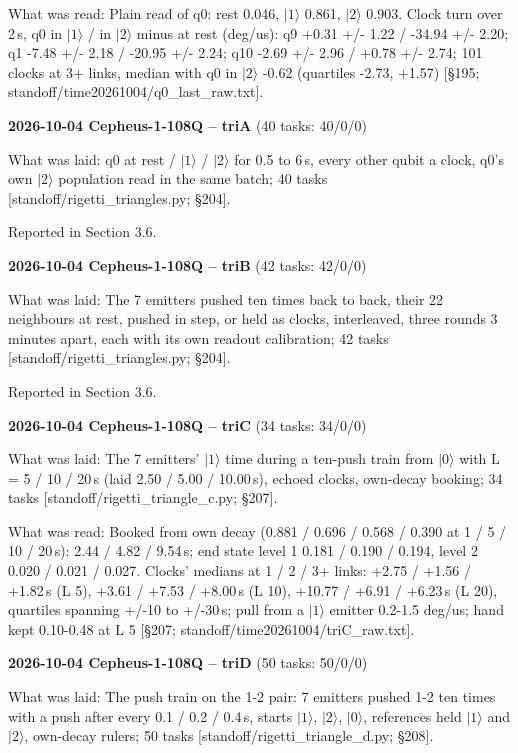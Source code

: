 \documentclass[11pt]{article}
\begin{document}
What was read: Plain read of q0: rest 0.046, \(|1\rangle\) 0.861, \(|2\rangle\) 0.903. Clock turn over 2\,\textmu s, q0 in \(|1\rangle\) / in \(|2\rangle\) minus at rest (deg/us): q9 +0.31 +/- 1.22 / -34.94 +/- 2.20; q1 -7.48 +/- 2.18 / -20.95 +/- 2.24; q10 -2.69 +/- 2.96 / +0.78 +/- 2.74; 101 clocks at 3+ links, median with q0 in \(|2\rangle\) -0.62 (quartiles -2.73, +1.57) {[}\S{}195; standoff/time20261004/q0\_last\_raw.txt{]}.

\textbf{2026-10-04 Cepheus-1-108Q -- triA} (40 tasks: 40/0/0)

What was laid: q0 at rest / \(|1\rangle\) / \(|2\rangle\) for 0.5 to 6\,\textmu s, every other qubit a clock, q0's own \(|2\rangle\) population read in the same batch; 40 tasks {[}standoff/rigetti\_triangles.py; \S{}204{]}.

Reported in Section 3.6.

\textbf{2026-10-04 Cepheus-1-108Q -- triB} (42 tasks: 42/0/0)

What was laid: The 7 emitters pushed ten times back to back, their 22 neighbours at rest, pushed in step, or held as clocks, interleaved, three rounds 3 minutes apart, each with its own readout calibration; 42 tasks {[}standoff/rigetti\_triangles.py; \S{}204{]}.

Reported in Section 3.6.

\textbf{2026-10-04 Cepheus-1-108Q -- triC} (34 tasks: 34/0/0)

What was laid: The 7 emitters' \(|1\rangle\) time during a ten-push train from \(|0\rangle\) with L = 5 / 10 / 20\,\textmu s (laid 2.50 / 5.00 / 10.00\,\textmu s), echoed clocks, own-decay booking; 34 tasks {[}standoff/rigetti\_triangle\_c.py; \S{}207{]}.

What was read: Booked from own decay (0.881 / 0.696 / 0.568 / 0.390 at 1 / 5 / 10 / 20\,\textmu s): 2.44 / 4.82 / 9.54\,\textmu s; end state level 1 0.181 / 0.190 / 0.194, level 2 0.020 / 0.021 / 0.027. Clocks' medians at 1 / 2 / 3+ links: +2.75 / +1.56 / +1.82\,\textmu s (L 5), +3.61 / +7.53 / +8.00\,\textmu s (L 10), +10.77 / +6.91 / +6.23\,\textmu s (L 20), quartiles spanning +/-10 to +/-30\,\textmu s; pull from a \(|1\rangle\) emitter 0.2-1.5 deg/us; hand kept 0.10-0.48 at L 5 {[}\S{}207; standoff/time20261004/triC\_raw.txt{]}.

\textbf{2026-10-04 Cepheus-1-108Q -- triD} (50 tasks: 50/0/0)

What was laid: The push train on the 1-2 pair: 7 emitters pushed 1-2 ten times with a push after every 0.1 / 0.2 / 0.4\,\textmu s, starts \(|1\rangle\), \(|2\rangle\), \(|0\rangle\), references held \(|1\rangle\) and \(|2\rangle\), own-decay rulers; 50 tasks {[}standoff/rigetti\_triangle\_d.py; \S{}208{]}.
\end{document}
